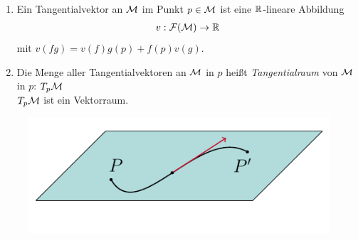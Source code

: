 \begin{defs}
\begin{enumerate}
\item Ein Tangentialvektor an $\mathcal{M}$ im Punkt $p \in \mathcal{M}$ ist eine $\mathbb{R}$-lineare Abbildung
\begin{align*}
v: \mathcal{F}(\mathcal{M}) \rightarrow \mathbb{R}
\end{align*}
mit $v(fg) = v(f)g(p) + f(p)v(g)$.
\item Die Menge aller Tangentialvektoren an $\mathcal{M}$ in $p$ heißt \textit{Tangentialraum} von $\mathcal{M}$ in $p$: $T_p \mathcal{M}$\\
$T_p \mathcal{M}$ ist ein Vektorraum.
\end{enumerate}

\begin{figure}[H]
\centering
\includegraphics[scale=1]{figures/tikz/tangentline.pdf}
\end{figure}
\end{defs}
